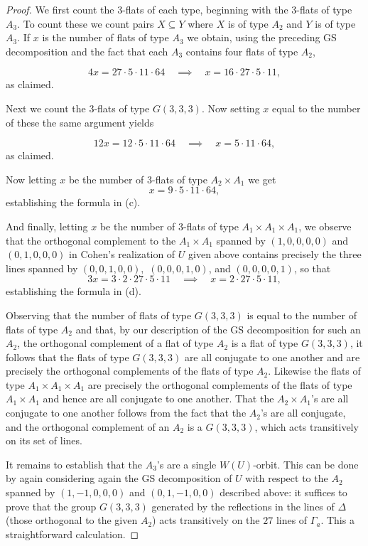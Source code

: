 \documentclass[11pt, reqno]{amsart}
\numberwithin{equation}{section}
\theoremstyle{definition}
\theoremstyle{plain}
\begin{document}
\begin{proof}
We first count the $3$-flats of each type, beginning with the $3$-flats of type $A_3$. To count these we count pairs $X \subseteq Y$ where $X$ is of type $A_2$ and $Y$ is of type $A_3$. If $x$ is the number of flats of type $A_3$ we obtain, using the preceding GS decomposition and the fact that each $A_3$ contains four flats of type $A_2$, 

$$4x=27 \cdot 5 \cdot 11 \cdot 64 \quad \implies \quad x=16 \cdot 27 \cdot 5 \cdot 11,$$ as claimed.

Next we count the $3$-flats of type $G(3,3,3)$. Now setting $x$ equal to the number of these the same argument yields 

$$12x=12  \cdot 5 \cdot 11 \cdot 64 \quad \implies \quad x=5 \cdot 11 \cdot 64,$$ as claimed.

Now letting $x$ be the number of $3$-flats of type $A_2 \times A_1$ we get
$$x=9 \cdot 5 \cdot 11 \cdot 64,$$ establishing the formula in (c).

And finally, letting $x$ be the number of $3$-flats of type $A_1 \times A_1 \times A_1$, we observe that the orthogonal complement to the $A_1 \times A_1$ spanned by $(1,0,0,0,0)$ and $(0,1,0,0,0)$ in Cohen's realization of $U$ given above contains precisely the three lines spanned by $(0,0,1,0,0),$ $(0,0,0,1,0)$, and $(0,0,0,0,1)$, so that
$$3x=3 \cdot 2 \cdot 27 \cdot 5 \cdot 11 \quad \implies \quad x=2 \cdot 27 \cdot 5 \cdot 11,$$ establishing the formula in (d). 

Observing that the number of flats of type $G(3,3,3)$ is equal to the number of flats of type $A_2$ and that, by our description of the GS decomposition for such an $A_2$, the orthogonal complement of a flat of type $A_2$ is a flat of type $G(3,3,3)$, it follows that the flats of type $G(3,3,3)$ are all conjugate to one another and are precisely the orthogonal complements of the flats of type $A_2$. Likewise the flats of type $A_1 \times A_1 \times A_1$ are precisely the orthogonal complements of the flats of type $A_1 \times A_1$ and hence are all conjugate to one another. That the $A_2 \times A_1$'s are all conjugate to one another follows from the fact that the $A_2$'s are all conjugate, and the orthogonal complement of an $A_2$ is a $G(3,3,3)$, which acts transitively on its set of lines.  

It remains to establish that the $A_3$'s are a single $W(U)$-orbit. This can be done by again considering again the GS decomposition of $U$ with respect to the $A_2$ spanned by $(1,-1,0,0,0)$ and $(0,1,-1,0,0)$ described above: it suffices to prove that the group $G(3,3,3)$ generated by the reflections in the lines of $\Delta$ (those orthogonal to the given $A_2$) acts transitively on the $27$ lines of $\Gamma_a$. This a straightforward calculation.
\end{proof}
\end{document}
